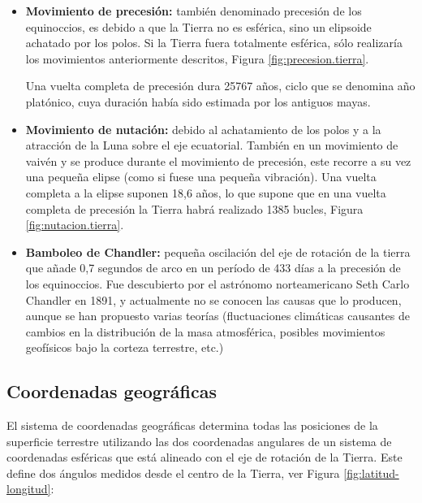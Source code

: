 \begin{itemize}
\item \textbf{Movimiento de precesión:} 
también denominado precesión de los equinoccios, es debido a que la Tierra no es esférica, sino un elipsoide achatado por los polos. Si la Tierra fuera totalmente esférica, sólo realizaría los movimientos anteriormente descritos, Figura \ref{fig:precesion.tierra}.

Una vuelta completa de precesión dura 25767 años, ciclo que se denomina año platónico, cuya duración había sido estimada por los antiguos mayas.

\item \textbf{Movimiento de nutación:} debido al achatamiento de los polos y a la atracción de la Luna sobre el eje ecuatorial. También en un movimiento de vaivén y se produce durante el movimiento de precesión, este recorre a su vez una pequeña elipse (como si fuese una pequeña vibración). Una vuelta completa a la elipse suponen 18,6 años, lo que supone que en una vuelta completa de precesión la Tierra habrá realizado 1385 bucles, Figura \ref{fig:nutacion.tierra}.

\item \textbf{Bamboleo de Chandler:} pequeña oscilación del eje de rotación de la tierra que añade 0,7 segundos de arco en un período de 433 días a la precesión de los equinoccios. Fue descubierto por el astrónomo norteamericano Seth Carlo Chandler en 1891, y actualmente no se conocen las causas que lo producen, aunque se han propuesto varias teorías (fluctuaciones climáticas causantes de cambios en la distribución de la masa atmosférica, posibles movimientos geofísicos bajo la corteza terrestre, etc.)


\end{itemize}


\subsection{Coordenadas geogr\'aficas}
\label{sec:06.coordenadas.geograficas}

El sistema de coordenadas geogr\'aficas determina todas las posiciones de la superficie terrestre utilizando las dos coordenadas angulares de un sistema de coordenadas esf\'ericas que est\'a alineado con el eje de rotaci\'on de la Tierra. Este define dos \'angulos medidos desde el centro de la Tierra, ver Figura \ref{fig:latitud-longitud}:

